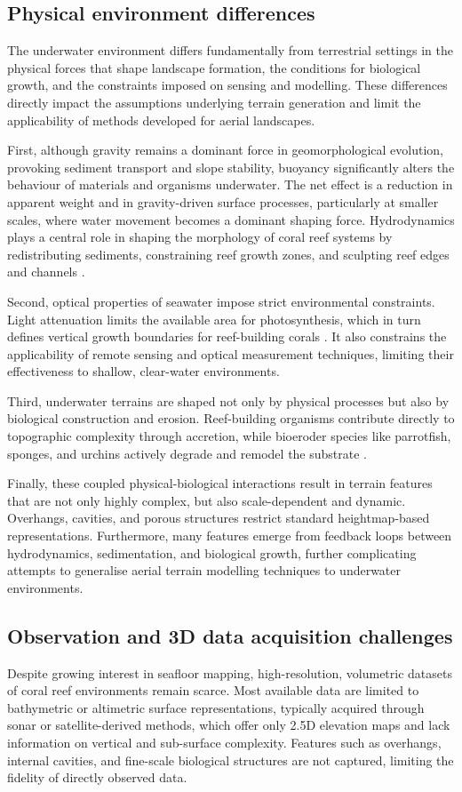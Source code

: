 \subsection{Physical environment differences}
The underwater environment differs fundamentally from terrestrial settings in the physical forces that shape landscape formation, the conditions for biological growth, and the constraints imposed on sensing and modelling. These differences directly impact the assumptions underlying terrain generation and limit the applicability of methods developed for aerial landscapes.

First, although gravity remains a dominant force in geomorphological evolution, provoking sediment transport and slope stability, buoyancy significantly alters the behaviour of materials and organisms underwater. The net effect is a reduction in apparent weight and in gravity-driven surface processes, particularly at smaller scales, where water movement becomes a dominant shaping force. Hydrodynamics plays a central role in shaping the morphology of coral reef systems by redistributing sediments, constraining reef growth zones, and sculpting reef edges and channels \cite{Lowe2015}.

Second, optical properties of seawater impose strict environmental constraints. Light attenuation limits the available area for photosynthesis, which in turn defines vertical growth boundaries for reef-building corals \cite{Huston1985}. It also constrains the applicability of remote sensing and optical measurement techniques, limiting their effectiveness to shallow, clear-water environments.

Third, underwater terrains are shaped not only by physical processes but also by biological construction and erosion. Reef-building organisms contribute directly to topographic complexity through accretion, while bioeroder species like parrotfish, sponges, and urchins actively degrade and remodel the substrate \cite{Perry2013}.

Finally, these coupled physical-biological interactions result in terrain features that are not only highly complex, but also scale-dependent and dynamic. Overhangs, cavities, and porous structures restrict standard heightmap-based representations. Furthermore, many features emerge from feedback loops between hydrodynamics, sedimentation, and biological growth, further complicating attempts to generalise aerial terrain modelling techniques to underwater environments.


\subsection{Observation and 3D data acquisition challenges}
Despite growing interest in seafloor mapping, high-resolution, volumetric datasets of coral reef environments remain scarce. Most available data are limited to bathymetric or altimetric surface representations, typically acquired through sonar or satellite-derived methods, which offer only 2.5D elevation maps and lack information on vertical and sub-surface complexity. Features such as overhangs, internal cavities, and fine-scale biological structures are not captured, limiting the fidelity of directly observed data.

